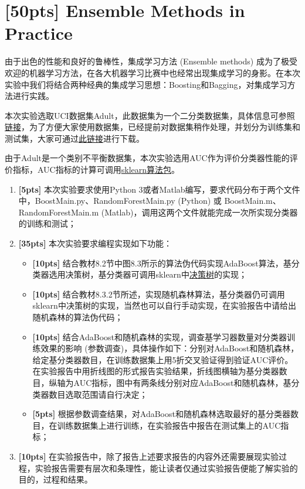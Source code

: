 \documentclass[a4paper,UTF8]{article}
\numberwithin{equation}{section}
\begin{document}
\section{[50pts] Ensemble Methods in Practice}

由于出色的性能和良好的鲁棒性，集成学习方法 (Ensemble methods) 成为了极受欢迎的机器学习方法，在各大机器学习比赛中也经常出现集成学习的身影。在本次实验中我们将结合两种经典的集成学习思想：Boosting和Bagging，对集成学习方法进行实践。

本次实验选取UCI数据集Adult，此数据集为一个二分类数据集，具体信息可参照\href{http://archive.ics.uci.edu/ml/datasets/Adult}{链接}，为了方便大家使用数据集，已经提前对数据集稍作处理，并划分为训练集和测试集，大家可通过\href{ftp://lamda.nju.edu.cn/ml2018/PS5/adult_dataset.zip}{此链接}进行下载。

由于Adult是一个类别不平衡数据集，本次实验选用AUC作为评价分类器性能的评价指标，AUC指标的计算可调用\href{http://scikit-learn.org/stable/modules/generated/sklearn.metrics.roc_auc_score.html}{sklearn算法包}。

\begin{enumerate}[(1)]
	\item \textbf{[5pts]} 本次实验要求使用Python 3或者Matlab编写，要求代码分布于两个文件中，BoostMain.py、RandomForestMain.py (Python) 或 BoostMain.m、RandomForestMain.m (Matlab)，调用这两个文件就能完成一次所实现分类器的训练和测试；
	
	\item \textbf{[35pts]} 本次实验要求编程实现如下功能：
	
	\begin{itemize}
		\item \textbf{[10pts]} 结合教材8.2节中图8.3所示的算法伪代码实现AdaBoost算法，基分类器选用决策树，基分类器可调用sklearn中\href{http://scikit-learn.org/stable/modules/generated/sklearn.tree.DecisionTreeClassifier.html}{决策树}的实现；
		\item \textbf{[10pts]} 结合教材8.3.2节所述，实现随机森林算法，基分类器仍可调用sklearn中决策树的实现，当然也可以自行手动实现，在实验报告中请给出随机森林的算法伪代码；
		\item \textbf{[10pts]} 结合AdaBoost和随机森林的实现，调查基学习器数量对分类器训练效果的影响 (参数调查)，具体操作如下：分别对AdaBoost和随机森林，给定基分类器数目，在训练数据集上用5折交叉验证得到验证AUC评价。在实验报告中用折线图的形式报告实验结果，折线图横轴为基分类器数目，纵轴为AUC指标，图中有两条线分别对应AdaBoost和随机森林，基分类器数目选取范围请自行决定；
		\item \textbf{[5pts]} 根据参数调查结果，对AdaBoost和随机森林选取最好的基分类器数目，在训练数据集上进行训练，在实验报告中报告在测试集上的AUC指标；
	\end{itemize}
	
	\item \textbf{[10pts]} 在实验报告中，除了报告上述要求报告的内容外还需要展现实验过程，实验报告需要有层次和条理性，能让读者仅通过实验报告便能了解实验的目的，过程和结果。
	
\end{enumerate}
\end{document}
